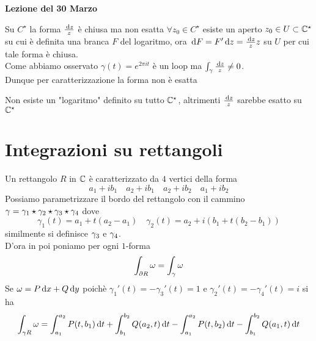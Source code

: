 

\textbf{Lezione del 30 Marzo}
\begin{cor}Su $C^\star$ la forma $\frac{\, \mathrm{d} z}{z}$ \`e chiusa ma non esatta
\proof $\forall z_0\in C^\star$ esiste un aperto $z_0\in U\subset \mathbb{C}^\star$ su cui \`e definita una branca $F$ del logaritmo, ora $\, \mathrm{d} F = F' \, \mathrm{d} z =\frac{\, \mathrm{d} z}{z}z$ su $U$ per cui tale forma \`e chiusa.\\
Come abbiamo osservato $\gamma(t)=e^{2\pi i t} $ \`e un loop ma $\int_\gamma \frac{\, \mathrm{d} z }{z}\neq 0 $.\\
Dunque per caratterizzazione la forma non \`e esatta
\end{cor}
\begin{cor}Non esiste un "logaritmo" definito su tutto $\mathbb{C}^\star$, altrimenti $\frac{\, \mathrm{d} z }{z}$ sarebbe esatto su $\mathbb{C}^\star$
\end{cor}
\newpage
\section{Integrazioni su rettangoli}
\begin{oss}Un rettangolo $R$ in $\mathbb{C}$ \`e caratterizzato da $4$ vertici della forma
$$a_1 + i b_1 \quad a_2 + i b_1 \quad a_2 + ib_2  \quad a_1 + i b_2 $$
Possiamo parametrizzare il bordo del rettangolo con il cammino $\gamma = \gamma_1 \star \gamma_2\star \gamma_3 \star \gamma_4$ 
dove 
$$\gamma_1(t) =a_1+t(a_2-a_1) \quad \gamma_2(t)=a_2 + i (b_1+t(b_2-b_1))$$
similmente si definisce $\gamma_3$ e $\gamma_4$.\\
D'ora in poi poniamo per ogni $1$-forma 
$$\int_{\partial R} \omega = \int_\gamma \omega$$
Se $\omega=P\, \mathrm{d} x + Q \, \mathrm{d} y$ poich\`e $\gamma_1'(t) = -\gamma_3'(t) =1 $ e $\gamma_2'(t) = -\gamma_4'(t)=i$ si ha
$$ \int_{\gamma R} \omega = \int_{a_1}^{a_2} P(t,b_1) \, \mathrm{d}t + \int_{b_1}^{b_2}Q(a_2, t) \, \mathrm{d}t -\int_{a_1}^{a_2}P(t,b_2)\, \mathrm{d}t - \int_{b_1}^{b_2}Q(a_1, t) \, \mathrm{d}t $$
\end{oss}

